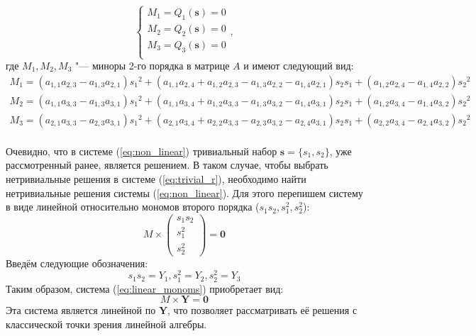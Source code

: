 \begin{equation}\label{eq:non_linear}
	\begin{cases}
		M_1 = Q_1(\mathbf{s}) = 0 \\
		M_2 = Q_2(\mathbf{s}) = 0 \\
		M_3 = Q_3(\mathbf{s}) = 0 \\
	\end{cases},
\end{equation}
где $M_1, M_2, M_3$ "--- миноры 2-го порядка в матрице $A$ и имеют следующий вид:
$$
\begin{matrix}
M_1 = (a_{1,1}a_{2,3} - a_{1,3}a_{2,1}) {s_{1}}^{2} + (a_{1,1}a_{2,4} + a_{1,2}a_{2,3} - a_{1,3}a_{2,2} - 
a_{1,4}a_{2,1}) s_{2}s_{1} + (a_{1,2}a_{2,4} - a_{1,4}a_{2,2}) {s_{2}}^{2} \\

M_2 = (a_{1,1}a_{3,3} - a_{1,3}a_{3,1}) {s_{1}}^{2} + (a_{1,1}a_{3,4} + a_{1,2}a_{3,3} - a_{1,3}a_{3,2} - 
a_{1,4}a_{3,1}) s_{2}s_{1} + (a_{1,2}a_{3,4} - a_{1,4}a_{3,2}) {s_{2}}^{2} \\

M_3 = (a_{2,1}a_{3,3} - a_{2,3}a_{3,1}) {s_{1}}^{2} + (a_{2,1}a_{3,4} + a_{2,2}a_{3,3} -a _{2,3}a_{3,2} - 
a_{2,4}a_{3,1}) s_{2}s_{1} + (a_{2,2}a_{3,4} - a_{2,4}a_{3,2}) {s_{2}}^{2} \\
\end{matrix}
$$

Очевидно, что в системе (\ref{eq:non_linear}) тривиальный набор $\mathbf{s} = \{s_1, s_2\}$, уже 
рассмотренный ранее, является решением. В таком случае, чтобы выбрать нетривиальные решения в системе 
(\ref{eq:trivial_r}), необходимо найти нетривиальные решения системы (\ref{eq:non_linear}). Для этого 
перепишем систему в виде линейной относительно мономов второго порядка ($s_1 s_2, s_1^2, s_2^2$):
\begin{equation}\label{eq:linear_monoms}
	M \times \begin{pmatrix} s_1 s_2 \\ s_1 ^ 2 \\ s_2 ^ 2 \end{pmatrix} = \mathbf{0}
\end{equation}
Введём следующие обозначения: 
$$
	s_1 s_2 = Y_1, s_1^2 = Y_2, s_2^2 = Y_3
$$
Таким образом, система (\ref{eq:linear_monoms}) приобретает вид:
\begin{equation}\label{eq:linear_y}
	M \times \mathbf{Y} = \mathbf{0}
\end{equation}
Эта система является линейной по $\mathbf{Y}$, что позволяет рассматривать её решения с классической 
точки зрения линейной алгебры.


